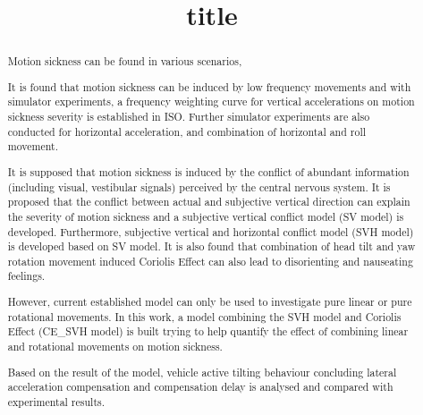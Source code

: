 \documentclass[conference]{IEEEtran}
\begin{document}
\title{
title
}
\author{
\and
{}
}

\maketitle

\begin{abstract}
Motion sickness can be found in various scenarios,

It is found that motion sickness can be induced by low frequency movements and with simulator experiments, a frequency weighting curve for vertical accelerations on motion sickness severity is established in ISO. Further simulator experiments are also conducted for horizontal acceleration, and combination of horizontal and roll movement.

It is supposed that motion sickness is induced by the conflict of abundant information (including visual, vestibular signals) perceived by the central nervous system.
%
It is proposed that the conflict between actual and subjective vertical direction can explain the severity of motion sickness and a subjective vertical conflict model (SV model) is developed. Furthermore, subjective vertical and horizontal conflict model (SVH model) is developed based on SV model. 
%
It is also found that combination of head tilt and yaw rotation movement induced Coriolis Effect can also lead to disorienting and nauseating feelings.

However, current established model can only be used to investigate pure linear or pure rotational movements.
In this work, a model combining the SVH model and Coriolis Effect (CE\_SVH model) is built trying to help quantify the effect of combining linear and rotational movements on motion sickness.

Based on the result of the model, vehicle active tilting behaviour concluding lateral acceleration compensation and compensation delay is analysed and compared with experimental results. 

\end{abstract}
\end{document}
